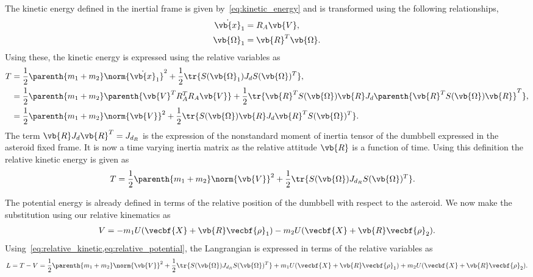 \documentclass[11pt, reqno]{article}    %
\begin{document}
The kinetic energy defined in the inertial frame is given by~\cref{eq:kinetic_energy} and is transformed using the following relationships,
\begin{align*}
    \dot{\vb{x}}_1 &= R_A \vb{V} , \\
    \vb{\Omega}_1 &= \vb{R}^T \vb{\Omega}.
\end{align*}
Using these, the kinetic energy is expressed using the relative variables as
\begin{align*}
    T &= \frac{1}{2} \parenth{m_1 + m_2} \norm{\dot{\vb{x}}_1}^2 + \frac{1}{2} \tr{S(\vb{\Omega}_1) J_d S(\vb{\Omega})^T}, \nonumber\\
    &= \frac{1}{2} \parenth{m_1 + m_2} \parenth{\vb{V}^T R_A^T R_A \vb{V}} + \frac{1}{2} \tr{\vb{R}^T S(\vb{\Omega})\vb{R} J_d \parenth{\vb{R}^TS(\vb{\Omega})\vb{R}}^T} , \\
    &= \frac{1}{2} \parenth{m_1 + m_2} \norm{\vb{V}}^2 + \frac{1}{2} \tr{S(\vb{\Omega}) \vb{R} J_d \vb{R}^T S(\vb{\Omega})^T}.
\end{align*}
The term \( \vb{R} J_d \vb{R}^T = J_{d_R}\) is the expression of the nonstandard moment of inertia tensor of the dumbbell expressed in the asteroid fixed frame. 
It is now a time varying inertia matrix as the relative attitude \( \vb{R} \) is a function of time.
Using this definition the relative kinetic energy is given as
\begin{align}\label{eq:relative_kinetic}
    T &= \frac{1}{2} \parenth{m_1 + m_2} \norm{\vb{V}}^2 + \frac{1}{2} \tr{S(\vb{\Omega}) J_{d_R} S(\vb{\Omega})^T}.
\end{align}

The potential energy is already defined in terms of the relative position of the dumbbell with respect to the asteroid.
We now make the substitution using our relative kinematics as
\begin{align}\label{eq:relative_potential}
    V = -m_1 U(\vecbf{X} + \vb{R} \vecbf{\rho}_1) - m_2 U(\vecbf{X}+\vb{R} \vecbf{\rho}_2).
\end{align}
Using~\cref{eq:relative_kinetic,eq:relative_potential}, the Langrangian is expressed in terms of the relative variables as 
\begin{align}\label{eq:relative_lagrangian}
    L = T-V = \frac{1}{2} \parenth{m_1 + m_2} \norm{\vb{V}}^2 + \frac{1}{2} \tr{S(\vb{\Omega}) J_{d_R} S(\vb{\Omega})^T} +m_1 U(\vecbf{X} + \vb{R} \vecbf{\rho}_1) + m_2 U(\vecbf{X}+ \vb{R} \vecbf{\rho}_2) .
\end{align}
\end{document}
